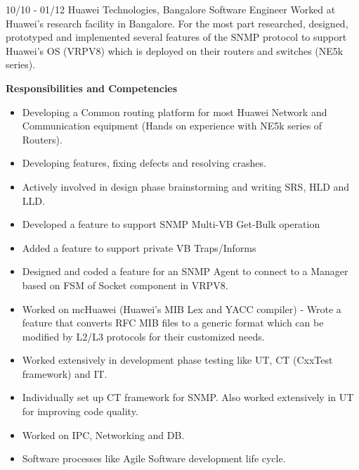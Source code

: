 \documentclass[]{priyesh-cv}
\begin{document}
\begin{entrylist}
  \entry
    {10/10 - 01/12}
    {Huawei Technologies, Bangalore}
    {Software Engineer}
    {Worked at Huawei's research facility in Bangalore. For the most part researched, designed, prototyped and implemented several features of the SNMP protocol to support Huawei's OS (VRPV8) which is deployed on their routers and switches (NE5k series).}
    {\textbf{Responsibilities and Competencies}
    \begin{itemize}
        \item Developing a Common routing platform for most  Huawei Network and Communication equipment (Hands on experience with NE5k series of Routers).
        \item Developing features, fixing defects and resolving crashes.
        \item Actively involved in design phase brainstorming and writing SRS, HLD and LLD.
        \item Developed a feature to support SNMP Multi-VB Get-Bulk operation
        \item Added a feature to support private VB Traps/Informs
        \item Designed and coded a feature for an SNMP Agent to connect to a Manager based on FSM of Socket component in VRPV8.
        \item Worked on mcHuawei (Huawei's MIB Lex and YACC compiler) - Wrote a feature that converts RFC MIB files to a generic format which can be modified by L2/L3 protocols for their customized needs. 
    \end{itemize}
    }
\end{entrylist}

\begin{entrylist}
  \entry  
    {}{}{}{}
    {
    \begin{itemize}
        \item Worked extensively in development phase testing like UT, CT (CxxTest  framework) and IT. 
        \item Individually set up CT framework for SNMP. Also worked
          extensively in UT for improving code quality.
        \item Worked on IPC, Networking and DB.
        \item Software processes like Agile Software development life cycle.
          
    \end{itemize}
    }
\end{entrylist}
\end{document}
